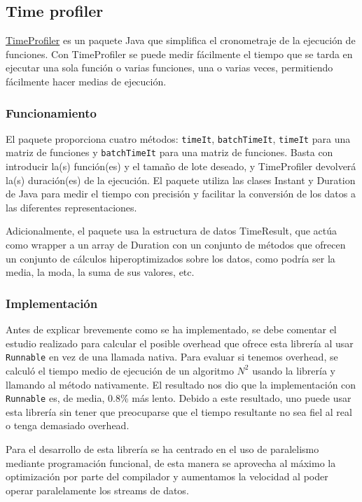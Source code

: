 \subsection{Time profiler}
\href{https://github.com/Zygmut/TimeProfiler}{TimeProfiler} es un paquete Java que simplifica el cronometraje de la ejecución de funciones. Con TimeProfiler se puede medir fácilmente el tiempo que se tarda en ejecutar una sola función o varias funciones, una o varias veces, permitiendo fácilmente hacer medias de ejecución.

\subsubsection{Funcionamiento}
El paquete proporciona cuatro métodos: \texttt{timeIt}, \texttt{batchTimeIt}, \texttt{timeIt} para una matriz de funciones y \texttt{batchTimeIt} para una matriz de funciones. Basta con introducir la(s) función(es) y el tamaño de lote deseado, y TimeProfiler devolverá la(s) duración(es) de la ejecución. El paquete utiliza las clases Instant y Duration de Java para medir el tiempo con precisión y facilitar la conversión de los datos a las diferentes representaciones.\bigskip

Adicionalmente, el paquete usa la estructura de datos TimeResult, que actúa como wrapper a un array de Duration con un conjunto de métodos que ofrecen un conjunto de cálculos hiperoptimizados sobre los datos, como podría ser la media, la moda, la suma de sus valores, etc.

\subsubsection{Implementación}

Antes de explicar brevemente como se ha implementado, se debe comentar el estudio realizado para calcular el posible overhead que ofrece esta librería al usar \texttt{Runnable} en vez de una llamada nativa. Para evaluar si tenemos overhead, se calculó el tiempo medio de ejecución de un algoritmo $N^2$ usando la librería y llamando al método nativamente. El resultado nos dio que la implementación con \texttt{Runnable} es, de media, 0.8\% más lento. Debido a este resultado, uno puede usar esta librería sin tener que preocuparse que el tiempo resultante no sea fiel al real o tenga demasiado overhead.\bigskip

Para el desarrollo de esta librería se ha centrado en el uso de paralelismo mediante programación funcional, de esta manera se aprovecha al máximo la optimización por parte del compilador y aumentamos la velocidad al poder operar paralelamente los streams de datos.\bigskip

